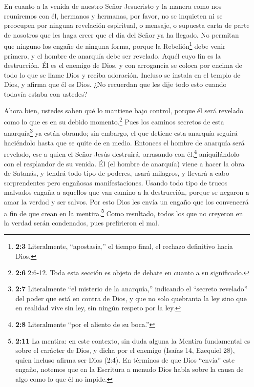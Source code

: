  En cuanto a la venida de nuestro Señor Jesucristo y la
manera como nos reuniremos con él, hermanos y hermanas,  por
favor, no se inquieten ni se preocupen por ninguna revelación
espiritual, o mensaje, o supuesta carta de parte de nosotros que les
haga creer que el día del Señor ya ha llegado.  No permitan
que ninguno los engañe de ninguna forma, porque la Rebelión\footnote{\textbf{2:3}
  Literalmente, ``apostasía,'' el tiempo final, el rechazo definitivo
  hacia Dios.} debe venir primero, y el hombre de anarquía debe ser
revelado. Aquél cuyo fin es la destrucción.  Él es el
enemigo de Dios, y con arrogancia se coloca por encima de todo lo que se
llame Dios y reciba adoración. Incluso se instala en el templo de Dios,
y afirma que él es Dios.  ¿No recuerdan que les dije todo
esto cuando todavía estaba con ustedes?

 Ahora bien, ustedes saben qué lo mantiene bajo control,
porque él será revelado como lo que es en su debido momento.\footnote{\textbf{2:6}
  2:6-12. Toda esta sección es objeto de debate en cuanto a su
  significado.}  Pues los caminos secretos de esta
anarquía\footnote{\textbf{2:7} Literalmente ``el misterio de la
  anarquía,'' indicando el ``secreto revelado'' del poder que está en
  contra de Dios, y que no solo quebranta la ley sino que en realidad
  vive sin ley, sin ningún respeto por la ley.} ya están obrando; sin
embargo, el que detiene esta anarquía seguirá haciéndolo hasta que se
quite de en medio.  Entonces el hombre de anarquía será
revelado, ese a quien el Señor Jesús destruirá, arrasando con
él,\footnote{\textbf{2:8} Literalmente ``por el aliento de su boca.''}
aniquilándolo con el resplandor de su venida.  Él (el hombre
de anarquía) viene a hacer la obra de Satanás, y tendrá todo tipo de
poderes, usará milagros, y llevará a cabo sorprendentes pero engañosas
manifestaciones.  Usando todo tipo de trucos malvados
engaña a aquellos que van camino a la destrucción, porque se negaron a
amar la verdad y ser salvos.  Por esto Dios les envía un
engaño que los convencerá a fin de que crean en la mentira.\footnote{\textbf{2:11}
  La mentira: en este contexto, sin duda alguna la Mentira fundamental
  es sobre el carácter de Dios, y dicha por el enemigo (Isaías 14,
  Ezequiel 28), quien incluso afirma ser Dios (2:4). En términos de que
  Dios ``envía'' este engaño, notemos que en la Escritura a menudo Dios
  habla sobre la causa de algo como lo que él no impide.} 
Como resultado, todos los que no creyeron en la verdad serán condenados,
pues prefirieron el mal.

